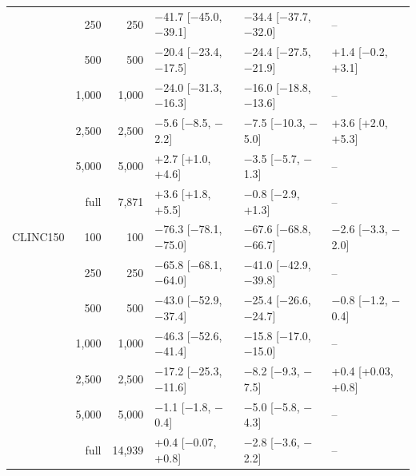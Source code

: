 \begin{tabular}{lrrlll}
 & 250 & 250 & $-$41.7 [$-$45.0, $-$39.1] & $-$34.4 [$-$37.7, $-$32.0] & -- \\
 & 500 & 500 & $-$20.4 [$-$23.4, $-$17.5] & $-$24.4 [$-$27.5, $-$21.9] & +1.4 [$-$0.2, +3.1] \\
 & 1{,}000 & 1{,}000 & $-$24.0 [$-$31.3, $-$16.3] & $-$16.0 [$-$18.8, $-$13.6] & -- \\
 & 2{,}500 & 2{,}500 & $-$5.6 [$-$8.5, $-$2.2] & $-$7.5 [$-$10.3, $-$5.0] & +3.6 [+2.0, +5.3] \\
 & 5{,}000 & 5{,}000 & +2.7 [+1.0, +4.6] & $-$3.5 [$-$5.7, $-$1.3] & -- \\
 & full & 7{,}871 & +3.6 [+1.8, +5.5] & $-$0.8 [$-$2.9, +1.3] & -- \\
\midrule
CLINC150 & 100 & 100 & $-$76.3 [$-$78.1, $-$75.0] & $-$67.6 [$-$68.8, $-$66.7] & $-$2.6 [$-$3.3, $-$2.0] \\
 & 250 & 250 & $-$65.8 [$-$68.1, $-$64.0] & $-$41.0 [$-$42.9, $-$39.8] & -- \\
 & 500 & 500 & $-$43.0 [$-$52.9, $-$37.4] & $-$25.4 [$-$26.6, $-$24.7] & $-$0.8 [$-$1.2, $-$0.4] \\
 & 1{,}000 & 1{,}000 & $-$46.3 [$-$52.6, $-$41.4] & $-$15.8 [$-$17.0, $-$15.0] & -- \\
 & 2{,}500 & 2{,}500 & $-$17.2 [$-$25.3, $-$11.6] & $-$8.2 [$-$9.3, $-$7.5] & +0.4 [+0.03, +0.8] \\
 & 5{,}000 & 5{,}000 & $-$1.1 [$-$1.8, $-$0.4] & $-$5.0 [$-$5.8, $-$4.3] & -- \\
 & full & 14{,}939 & +0.4 [$-$0.07, +0.8] & $-$2.8 [$-$3.6, $-$2.2] & -- \\
\bottomrule
\end{tabular}
